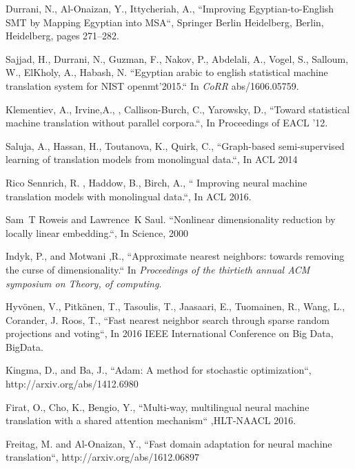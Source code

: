 \documentclass[a4paper]{article}
\begin{document}
\begin{thebibliography}{30}
Durrani, N., Al-Onaizan, Y.,  Ittycheriah, A.,  ``Improving Egyptian-to-English SMT by Mapping Egyptian into MSA``, Springer Berlin Heidelberg, Berlin, Heidelberg, pages 271--282.

 Sajjad, H., Durrani, N.,  Guzman, F., Nakov,  P., Abdelali, A., Vogel,  S., Salloum, W., ElKholy, A.,  Habash, N.
``Egyptian arabic to english statistical machine translation system for
  {NIST} openmt'2015.`` In {\em CoRR\/} abs/1606.05759.

 Klementiev, A., Irvine,A., , Callison-Burch, C., Yarowsky, D.,
 ``Toward statistical machine translation without parallel corpora.``, In Proceedings of EACL '12.

 Saluja, A., Hassan, H., Toutanova, K.,  Quirk, C.,
``Graph-based semi-supervised learning of translation models from
  monolingual data.``, In ACL 2014
	
Rico Sennrich, R. , Haddow, B., Birch, A.,
`` Improving neural machine translation models with monolingual data.``,  In ACL 2016.


Sam~T Roweis and Lawrence~K Saul. 
``Nonlinear dimensionality reduction by locally linear embedding.``,
In  Science, 2000


Indyk, P., and Motwani ,R.,
``Approximate nearest neighbors: towards removing the curse of dimensionality.``
In {\em Proceedings of the thirtieth annual ACM symposium on Theory,
  of computing\/}.

 Hyv{\"{o}}nen, V., Pitk{\"{a}}nen, T., Tasoulis, T., Jaasaari, E., Tuomainen, R., Wang, L., Corander, J. Roos, T., ``Fast nearest neighbor search through sparse random projections and
  voting``, In  2016 IEEE International Conference on Big Data, BigData.
	
 Kingma, D., and Ba, J., ``Adam: A method for stochastic optimization``,
http://arxiv.org/abs/1412.6980


	
Firat, O., Cho, K.,  Bengio, Y.,  ``Multi-way, multilingual neural machine translation with a shared attention mechanism``
,HLT-NAACL 2016.

Freitag, M. and Al{-}Onaizan, Y., 
``Fast domain adaptation for neural machine translation``, 
{http://arxiv.org/abs/1612.06897}




\end{thebibliography}
\end{document}

